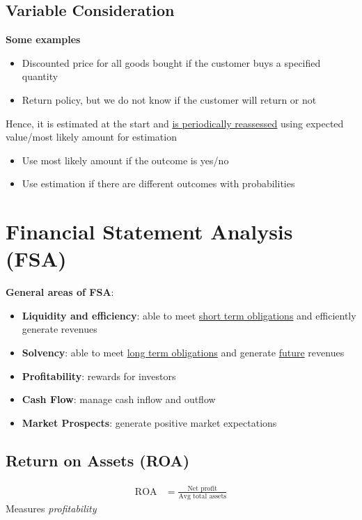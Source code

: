 \documentclass{article}
\begin{document}
\begin{multicols}{2}
\subsection{Variable Consideration}
\textbf{Some examples}
\begin{itemize}
	\item Discounted price for all goods bought if the customer buys a specified quantity
	\item Return policy, but we do not know if the customer will return or not
\end{itemize}
Hence, it is estimated at the start and \underline{is periodically reassessed} using expected value/most likely amount for estimation
\begin{itemize}
	\item Use most likely amount if the outcome is yes/no
	\item Use estimation if there are different outcomes with probabilities
\end{itemize}
\section{Financial Statement Analysis (FSA)}
\textbf{General areas of FSA}:
\begin{itemize}
	\item \textbf{Liquidity and efficiency}: able to meet \underline{short term obligations} and efficiently generate revenues
	\item \textbf{Solvency}: able to meet \underline{long term obligations} and generate \underline{future} revenues
	\item \textbf{Profitability}: rewards for investors
	\item \textbf{Cash Flow}: manage cash inflow and outflow
	\item \textbf{Market Prospects}: generate positive market expectations
\end{itemize}

\subsection{Return on Assets (ROA)}
\begin{equation*}
	\begin{aligned}
		\text{ROA} &= \frac{\text{Net profit}}{\text{Avg total assets}}
	\end{aligned}
\end{equation*}
Measures \textit{profitability}

\end{multicols}
\end{document}
